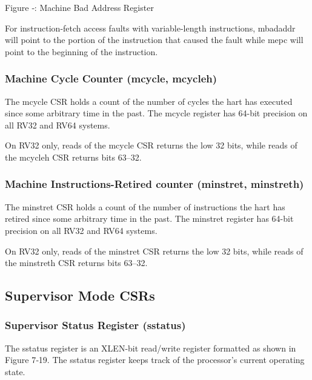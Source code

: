 \missingfigure{}

Figure ‑: Machine Bad Address Register

For instruction-fetch access faults with variable-length instructions,
mbadaddr will point to the portion of the instruction that caused the
fault while mepc will point to the beginning of the instruction.

\subsubsection{Machine Cycle Counter (mcycle,
mcycleh)}\label{machine-cycle-counter-mcycle-mcycleh}

The mcycle CSR holds a count of the number of cycles the hart has
executed since some arbitrary time in the past. The mcycle register has
64-bit precision on all RV32 and RV64 systems.

On RV32 only, reads of the mcycle CSR returns the low 32 bits, while
reads of the mcycleh CSR returns bits 63--32.

\subsubsection{Machine Instructions-Retired counter (minstret,
minstreth)}\label{machine-instructions-retired-counter-minstret-minstreth}

The minstret CSR holds a count of the number of instructions the hart
has retired since some arbitrary time in the past. The minstret register
has 64-bit precision on all RV32 and RV64 systems.

On RV32 only, reads of the minstret CSR returns the low 32 bits, while
reads of the minstreth CSR returns bits 63--32.

\protect\hypertarget{_Toc327108358}{}{}

\subsection{Supervisor Mode CSRs}\label{supervisor-mode-csrs}

\subsubsection{Supervisor Status Register (sstatus)
}\label{supervisor-status-register-sstatus}

The sstatus register is an XLEN-bit read/write register formatted as
shown in Figure 7‑19. The sstatus register keeps track of the
processor's current operating state.

